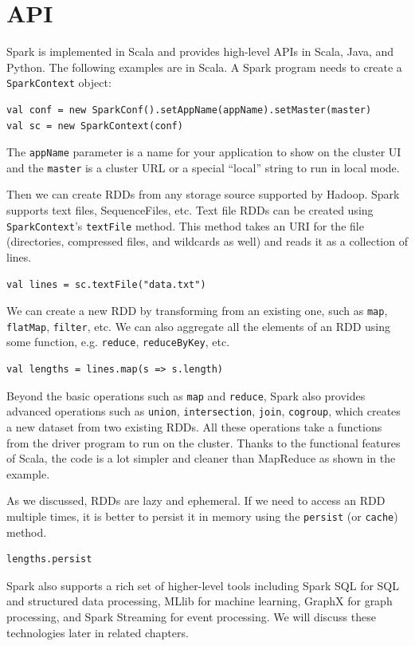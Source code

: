 \documentclass[11pt]{book}
\begin{document}
\section{API}
Spark is implemented in Scala and provides high-level APIs in Scala, Java, and Python. The following examples are in Scala. A Spark program needs to create a \texttt{SparkContext} object:
\begin{lstlisting}
val conf = new SparkConf().setAppName(appName).setMaster(master)
val sc = new SparkContext(conf)
\end{lstlisting}
The \texttt{appName} parameter is a name for your application to show on the cluster UI and the \texttt{master} is a cluster URL or a special ``local'' string to run in local mode.

Then we can create RDDs from any storage source supported by Hadoop. Spark supports text files, SequenceFiles, etc.
Text file RDDs can be created using \texttt{SparkContext}'s \texttt{textFile} method. This method takes an URI for the file (directories, compressed files, and wildcards as well) and reads it as a collection of lines.
\begin{lstlisting}
val lines = sc.textFile("data.txt")
\end{lstlisting}

We can create a new RDD by transforming from an existing one, such as \texttt{map}, \texttt{flatMap}, \texttt{filter}, etc. We can also aggregate all the elements of an RDD using some function, e.g. \texttt{reduce}, \texttt{reduceByKey}, etc.
\begin{lstlisting}
val lengths = lines.map(s => s.length)
\end{lstlisting}
Beyond the basic operations such as \texttt{map} and \texttt{reduce}, Spark also provides advanced operations such as \texttt{union}, \texttt{intersection}, \texttt{join}, \texttt{cogroup}, which creates a new dataset from two existing RDDs.
All these operations take a functions from the driver program to run on the cluster. Thanks to the functional features of Scala, the code is a lot simpler and cleaner than MapReduce as shown in the example.

As we discussed, RDDs are lazy and ephemeral. If we need to access an RDD multiple times, it is better to persist it in memory using the \texttt{persist} (or \texttt{cache}) method.
\begin{lstlisting}
lengths.persist
\end{lstlisting}

Spark also supports a rich set of higher-level tools including Spark SQL for SQL and structured data processing, MLlib for machine learning, GraphX for graph processing, and Spark Streaming for event processing. We will discuss these technologies later in related chapters. 
\end{document}
